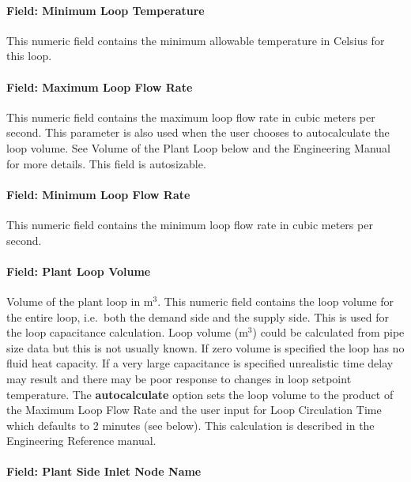 \paragraph{Field: Minimum Loop Temperature}\label{field-minimum-loop-temperature}

This numeric field contains the minimum allowable temperature in Celsius for this loop.

\paragraph{Field: Maximum Loop Flow Rate}\label{field-maximum-loop-flow-rate}

This numeric field contains the maximum loop flow rate in cubic meters per second. This parameter is also used when the user chooses to autocalculate the loop volume. See Volume of the Plant Loop below and the Engineering Manual for more details. This field is autosizable.

\paragraph{Field: Minimum Loop Flow Rate}\label{field-minimum-loop-flow-rate}

This numeric field contains the minimum loop flow rate in cubic meters per second.

\paragraph{Field: Plant Loop Volume}\label{field-plant-loop-volume}

Volume of the plant loop in m\(^{3}\). This numeric field contains the loop volume for the entire loop, i.e.~both the demand side and the supply side. This is used for the loop capacitance calculation. Loop volume (m\(^{3}\)) could be calculated from pipe size data but this is not usually known. If zero volume is specified the loop has no fluid heat capacity. If a very large capacitance is specified unrealistic time delay may result and there may be poor response to changes in loop setpoint temperature. The \textbf{autocalculate} option sets the loop volume to the product of the Maximum Loop Flow Rate and the user input for Loop Circulation Time which defaults to 2 minutes (see below). This calculation is described in the Engineering Reference manual.

\paragraph{Field: Plant Side Inlet Node Name}\label{field-plant-side-inlet-node-name}

